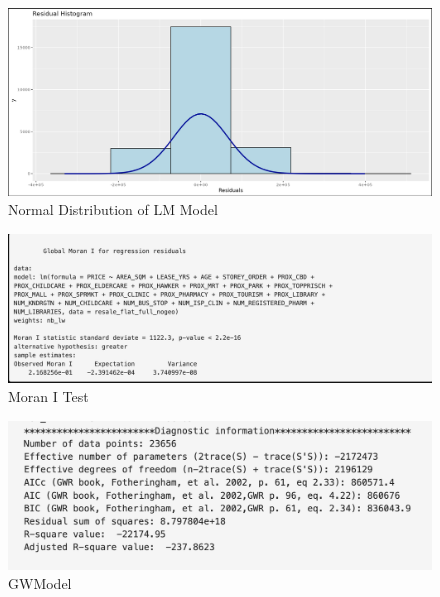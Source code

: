 \documentclass[manuscript,screen]{acmart}
\begin{document}
\begin{figure}

{\centering \includegraphics{images/Screenshot 2023-04-15 at 11.02.51 PM.png}

}

\caption{\label{fig-12}Normal Distribution of LM Model}

\end{figure}

\begin{figure}

{\centering \includegraphics{images/Screenshot 2023-04-15 at 11.00.00 PM-01.png}

}

\caption{\label{fig-13}Moran I Test}

\end{figure}

\begin{figure}

{\centering \includegraphics{images/Screenshot 2023-04-15 at 11.27.38 PM.png}

}

\caption{\label{fig-14}GWModel}

\end{figure}

\end{document}

